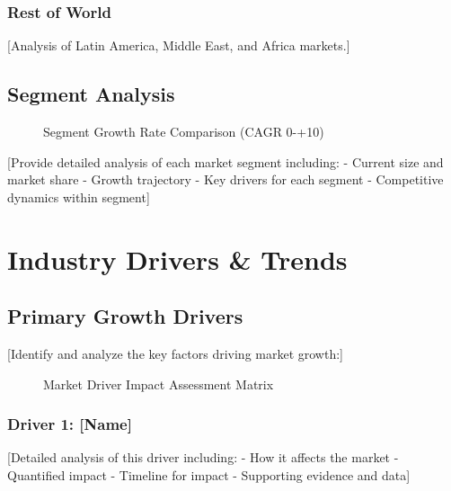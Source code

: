 \documentclass[11pt,letterpaper]{report}
\newcommand{\baseyear}{0}
\newcommand{\horizonyear}{\the\numexpr\baseyear+10\relax}    %
\begin{document}
\subsection{Rest of World}
[Analysis of Latin America, Middle East, and Africa markets.]

\section{Segment Analysis}


\begin{figure}[htbp]
\centering
\caption{Segment Growth Rate Comparison (CAGR \baseyear{}-\horizonyear{})}
\label{fig:segment_growth}
\end{figure}

[Provide detailed analysis of each market segment including:
- Current size and market share
- Growth trajectory
- Key drivers for each segment
- Competitive dynamics within segment]

\chapter{Industry Drivers \& Trends}

\section{Primary Growth Drivers}

[Identify and analyze the key factors driving market growth:]


\begin{figure}[htbp]
\centering
\caption{Market Driver Impact Assessment Matrix}
\label{fig:driver_matrix}
\end{figure}

\subsection{Driver 1: [Name]}
[Detailed analysis of this driver including:
- How it affects the market
- Quantified impact
- Timeline for impact
- Supporting evidence and data]
\end{document}
